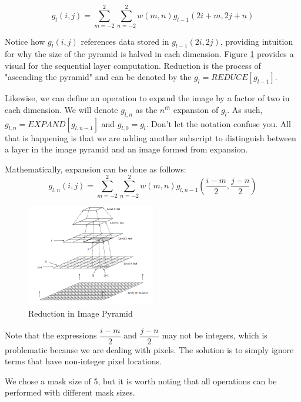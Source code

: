 \documentclass{article}
\begin{document}
\begin{equation*}
g_l(i,j) = \sum_{m=-2}^{2} \sum_{n=-2}^{2} w(m,n) g_{l-1}(2i+m, 2j+n)
\end{equation*}

Notice how $g_l(i,j)$ references data stored in $g_{l-1}(2i,2j)$, providing intuition for why the size of the pyramid is halved in each dimension. Figure \ref{fig:ImagePyramid} provides a visual for the sequential layer computation. Reduction is the process of "ascending the pyramid" and can be denoted by the $g_l = REDUCE[g_{l-1}]$.

Likewise, we can define an operation to expand the image by a factor of two in each dimension.  We will denote $g_{l,n}$ as the $n^{th}$ expansion of $g_l$.  As such, $g_{l,n} = EXPAND[g_{l,n-1}]$ and $g_{l,0} = g_l$. Don't let the notation confuse you.  All that is happening is that we are adding another subscript to distinguish between a layer in the image pyramid and an image formed from expansion. 

Mathematically, expansion can be done as follows:
\begin{equation*}
g_{l,n}(i,j) = \sum_{m=-2}^{2} \sum_{n=-2}^{2} w(m,n) g_{l,n-1}(\frac{i-m}{2}, \frac{j-n}{2})
\end{equation*}

\begin{figure}
  \centering
    \includegraphics[width=0.5\textwidth]{ImagePyramid.png}
    \vspace{-10pt}
  \caption{Reduction in Image Pyramid}
  \label{fig:ImagePyramid}
  \vspace{-25pt}
\end{figure}

Note that the expressions $\dfrac{i-m}{2}$ and $\dfrac{j-n}{2}$ may not be integers, which is problematic because we are dealing with pixels. The solution is to simply ignore terms that have non-integer pixel locations.  

We chose a mask size of 5, but it is worth noting that all operations can be performed with different mask sizes. 
\end{document}
